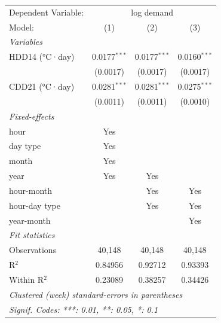 
\begingroup
\centering
\begin{tabular}{lccc}
   \tabularnewline \midrule \midrule
   Dependent Variable: & \multicolumn{3}{c}{log demand}\\
   Model:         & (1)            & (2)            & (3)\\  
   \midrule
   \emph{Variables}\\
   HDD14 (°C·day) & 0.0177$^{***}$ & 0.0177$^{***}$ & 0.0160$^{***}$\\   
                  & (0.0017)       & (0.0017)       & (0.0017)\\   
   CDD21 (°C·day) & 0.0281$^{***}$ & 0.0281$^{***}$ & 0.0275$^{***}$\\   
                  & (0.0011)       & (0.0011)       & (0.0010)\\   
   \midrule
   \emph{Fixed-effects}\\
   hour           & Yes            &                & \\  
   day type       & Yes            &                & \\  
   month          & Yes            &                & \\  
   year           & Yes            & Yes            & \\  
   hour-month     &                & Yes            & Yes\\  
   hour-day type  &                & Yes            & Yes\\  
   year-month     &                &                & Yes\\  
   \midrule
   \emph{Fit statistics}\\
   Observations   & 40,148         & 40,148         & 40,148\\  
   R$^2$          & 0.84956        & 0.92712        & 0.93393\\  
   Within R$^2$   & 0.23089        & 0.38257        & 0.34426\\  
   \midrule \midrule
   \multicolumn{4}{l}{\emph{Clustered (week) standard-errors in parentheses}}\\
   \multicolumn{4}{l}{\emph{Signif. Codes: ***: 0.01, **: 0.05, *: 0.1}}\\
\end{tabular}
\par\endgroup


